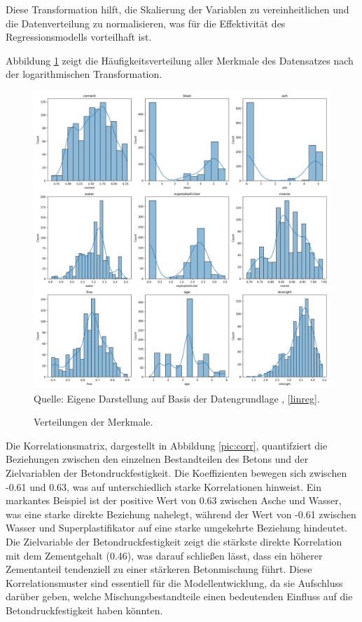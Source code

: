 Diese Transformation hilft, die Skalierung der Variablen zu vereinheitlichen 
und die Datenverteilung zu normalisieren, was für die Effektivität des Regressionsmodells vorteilhaft ist.

Abbildung \ref{pic:hist} zeigt die Häufigkeitsverteilung aller Merkmale des Datensatzes nach der logarithmischen Transformation. 

\begin{figure}[!h]
    \caption{Verteilungen der Merkmale.}
    \includegraphics[width=1\textwidth]{../scripts/images/dist.png}
    Quelle: Eigene Darstellung auf Basis der Datengrundlage \cite{misc_concrete_compressive_strength_165}, \ref{linreg}.
    \label{pic:hist}
\end{figure}

Die Korrelationsmatrix, dargestellt in Abbildung \ref{pic:corr}, 
quantifziert die Beziehungen zwischen den einzelnen Bestandteilen des Betons und der Zielvariablen der 
Betondruckfestigkeit. Die Koeffizienten bewegen sich zwischen -0.61 und 0.63, was auf 
unterschiedlich starke Korrelationen hinweist. Ein markantes Beispiel ist der positive Wert 
von 0.63 zwischen Asche und Wasser, was eine starke direkte Beziehung nahelegt, während der Wert 
von -0.61 zwischen Wasser und Superplastifikator auf eine starke umgekehrte Beziehung hindeutet. 
Die Zielvariable der Betondruckfestigkeit zeigt die stärkste direkte Korrelation mit dem Zementgehalt (0.46), 
was darauf schließen lässt, dass ein höherer Zementanteil tendenziell zu einer stärkeren Betonmischung führt. 
Diese Korrelationsmuster sind essentiell für die Modellentwicklung, da sie Aufschluss darüber geben, welche 
Mischungsbestandteile einen bedeutenden Einfluss auf die Betondruckfestigkeit haben könnten.

